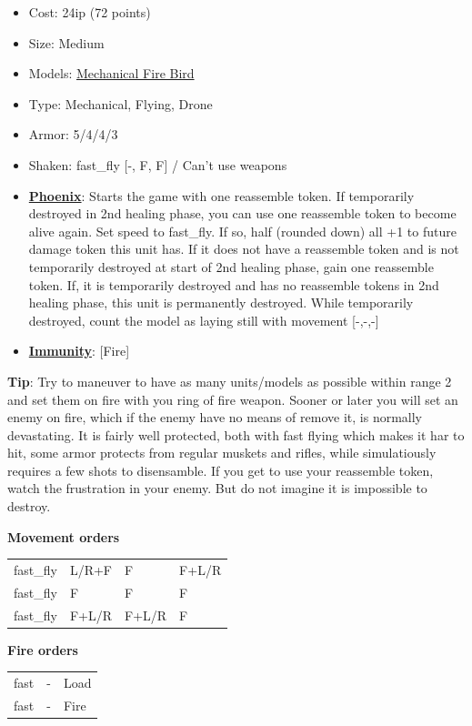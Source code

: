 \documentclass[a4paper,12pt]{article}
\begin{document}
\begin{itemize}
\item Cost: 24ip (72 points)
\item Size: Medium
\item Models: \hyperref[model-mechanical-fire-bird]{Mechanical Fire Bird}
\item Type: Mechanical, Flying, Drone
\item Armor: 5/4/4/3
\item Shaken: fast\_fly [-, F, F] / Can't use weapons
\item \textbf{\hyperref[rule-special-phoenix]{Phoenix}}: Starts the game with one reassemble token. If temporarily destroyed in 2nd healing phase, you can use one reassemble token to become alive again. Set speed to fast\_fly. If so, half (rounded down) all +1 to future damage token this unit has. If it does not have a reassemble token and is not temporarily destroyed at start of 2nd healing phase, gain one reassemble token. If, it is temporarily destroyed and has no reassemble tokens in 2nd healing phase, this unit is permanently destroyed. While temporarily destroyed, count the model as laying still with movement [-,-,-]
\item \textbf{\hyperref[rule-special-immunity]{Immunity}}: [Fire]

\end{itemize}
\noindent\textbf{Tip}: Try to maneuver to have as many units/models as possible within range 2 and set them on fire with you ring of fire weapon. Sooner or later you will set an enemy on fire, which if the enemy have no means of remove it, is normally devastating. It is fairly well protected, both with fast flying which makes it har to hit, some armor protects from regular muskets and rifles, while simulatiously requires a few shots to disensamble. If you get to use your reassemble token, watch the frustration in your enemy. But do not imagine it is impossible to destroy.

\noindent\textbf{Movement orders}

\begin{tabular}{llll}
fast\_fly & L/R+F & F & F+L/R \\
fast\_fly & F & F & F \\
fast\_fly & F+L/R & F+L/R & F \\
\end{tabular}
\vspace{1ex}


\noindent\textbf{Fire orders}

\begin{tabular}{lll}
fast & - & Load \\
fast & - & Fire \\
\end{tabular}
\vspace{1ex}
\end{document}
